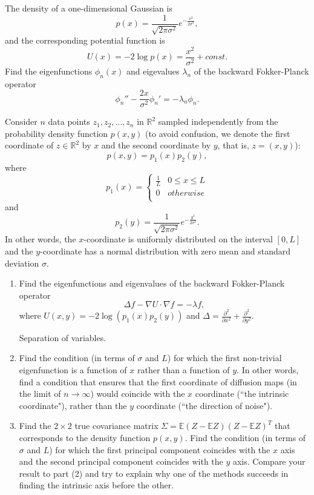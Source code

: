 \begin{myexercise}
The density of a one-dimensional Gaussian is $$p(x) = \frac{1}{\sqrt{2\pi\sigma^2}}e^{-\frac{x^2}{2\sigma^2}},$$ and the corresponding potential function is $$U(x)=-2\log p(x) = \frac{x^2}{\sigma^2} + const.$$  Find the eigenfunctions $\phi_n(x)$ and eigevalues $\lambda_n$ of the backward Fokker-Planck operator
    $$\phi_n'' - \frac{2x}{\sigma^2}\phi_n' = -\lambda_n \phi_n.$$
\end{myexercise}

\begin{myexercise}
Consider $n$ data points $z_1,z_2,\ldots,z_n$ in $\mathbb{R}^2$ sampled independently from the probability density function $p(x,y)$ (to avoid confusion, we denote the first coordinate of $z\in \mathbb{R}^2$ by $x$ and the second coordinate by $y$, that is, $z=(x,y)$):
$$p(x,y) = p_1(x)p_2(y),$$
where
$$p_1(x) = \left\{\begin{array}{cc}
\frac{1}{L} & 0\leq x \leq L \\
0 & otherwise \\
\end{array}\right.$$
and
$$p_2(y) = \frac{1}{\sqrt{2\pi\sigma^2}}e^{-\frac{y^2}{2\sigma^2}}.$$
In other words, the $x$-coordinate is uniformly distributed on the interval $[0,L]$ and the $y$-coordinate has a normal distribution with zero mean and standard deviation $\sigma$.

\begin{enumerate}
\item Find the eigenfunctions and eigenvalues of the backward Fokker-Planck operator
$$\Delta f - \nabla U \cdot \nabla f = -\lambda f,$$
where $U(x,y) = -2\log (p_1(x)p_2(y))$ and $\Delta = \frac{\partial^2}{\partial x^2} + \frac{\partial^2}{\partial y^2}$.
\begin{hint}Separation of variables. 
\end{hint}

\item Find the condition (in terms of $\sigma$ and $L$) for which the first non-trivial eigenfunction is a function of $x$ rather than a function of $y$. In other words, find a condition that ensures that the first coordinate of diffusion maps (in the limit of $n\to \infty$) would coincide with the $x$ coordinate (``the intrinsic coordinate"), rather than the $y$ coordinate (``the direction of noise").

\item Find the $2 \times 2$ true covariance matrix $\Sigma = \mathbb{E}(Z-\mathbb{E}Z)(Z-\mathbb{E}Z)^T$ that corresponds to the density function $p(x,y)$. Find the condition (in terms of $\sigma$ and $L$) for which the first principal component coincides with the $x$ axis and the second principal component coincides with the $y$ axis. Compare your result to part (2) and try to explain why one of the methods succeeds in finding the intrinsic axis before the other.

\end{enumerate}

\end{myexercise}
